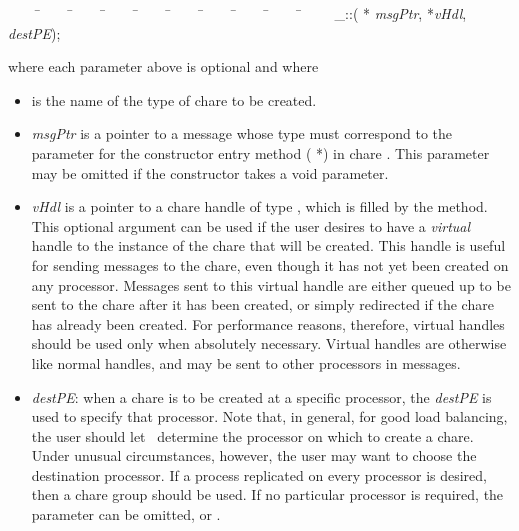 \begin{tabbing}
~~~~ \=~~~~ \=~~~~ \=~~~~ \=~~~~ \=~~~~ \=~~~~ \=~~~~ \=~~~~ \=~~~~ \kill
\> \_::( *{\it
msgPtr},  *{\it vHdl},  {\it destPE});
\end{tabbing}

where each parameter above is optional and where

\begin{itemize}

\item {} is the name of the type of chare to be
created.

\item {\it msgPtr} is a pointer to a message whose type must
correspond to the parameter for the constructor entry method
( *) in chare .  This
parameter may be omitted if the constructor takes a void
parameter.

\item {\it vHdl} is a pointer to a chare handle of type
, which is filled by the  method. This optional
argument can be used if the user desires to have a {\em virtual} handle
 to the instance of the chare that will be
created. This handle is useful for sending messages to the
chare, even though it has not yet been created on any processor.
Messages sent to this virtual handle are either queued up to be sent to the
chare after it has been created, or simply redirected if the
chare has already been created. For performance reasons,
therefore, virtual handles should be used only when absolutely necessary.
Virtual handles are otherwise like normal handles, and may be
sent to other processors in messages.  

\item {\it destPE}: when a chare is to be created at a specific
processor, the {\it destPE} is used to specify that processor.  Note that, in
general, for good load balancing, the user should let
\charmpp\ determine the processor on which to create a chare.
Under unusual circumstances, however, the user may want to choose the
destination processor.  If a process replicated on every processor is desired,
then a chare group should be used.  If no particular
processor is required, the parameter can be omitted, or
.

\end{itemize}

